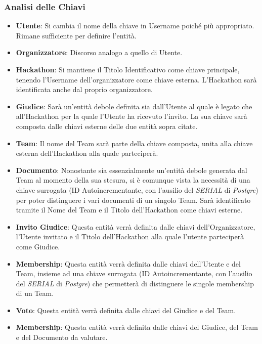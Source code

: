 \documentclass[a4paper, 10pt]{article}
\begin{document}
	\subsubsection{Analisi delle Chiavi}
	\begin{itemize}
		\item \textbf{Utente}: Si cambia il nome della chiave in Username poiché più appropriato. Rimane sufficiente per definire l'entità.
		\item \textbf{Organizzatore}: Discorso analogo a quello di Utente.
		\item \textbf{Hackathon}: Si mantiene il Titolo Identificativo come chiave principale, tenendo l'Username dell'organizzatore come chiave esterna. L'Hackathon sarà identificata anche dal proprio organizzatore.
		\item \textbf{Giudice}: Sarà un'entità debole definita sia dall'Utente al quale è legato che all'Hackathon per la quale l'Utente ha ricevuto l'invito. La sua chiave sarà composta dalle chiavi esterne delle due entità sopra citate.
		\item \textbf{Team}: Il nome del Team sarà parte della chiave composta, unita alla chiave esterna dell'Hackathon alla quale parteciperà.
		\item \textbf{Documento}: Nonostante sia essenzialmente un'entità debole generata dal Team al momento della sua stesura, si è comunque vista la necessità di una chiave surrogata (ID Autoincrementante, con l'ausilio del \textit{SERIAL} di \textit{Postgre}) per poter distinguere i vari documenti di un singolo Team. Sarà identificato tramite il Nome del Team e il Titolo dell'Hackathon come chiavi esterne.
		\item \textbf{Invito Giudice}: Questa entità verrà definita dalle chiavi dell'Organizzatore, l'Utente invitato e il Titolo dell'Hackathon alla quale l'utente parteciperà come Giudice.
		\item \textbf{Membership}: Questa entità verrà definita dalle chiavi dell'Utente e del Team, insieme ad una chiave surrogata (ID Autoincrementante, con l'ausilio del \textit{SERIAL} di \textit{Postgre}) che permetterà di distinguere le singole membership di un Team.
		\item \textbf{Voto}: Questa entità verrà definita dalle chiavi del Giudice e del Team.
		\item \textbf{Membership}: Questa entità verrà definita dalle chiavi del Giudice, del Team e del Documento da valutare.
	\end{itemize}
\end{document}

